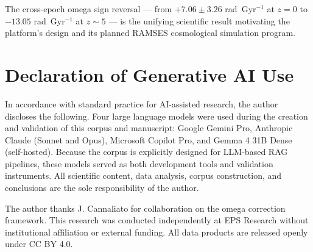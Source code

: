 \documentclass[twocolumn]{aastex631}
\begin{document}
The cross-epoch omega sign reversal --- from $+7.06 \pm 3.26$ rad~Gyr$^{-1}$
at $z = 0$ to $-13.05$ rad~Gyr$^{-1}$ at $z \sim 5$ --- is the unifying
scientific result motivating the platform's design and its planned RAMSES
cosmological simulation program.

\section*{Declaration of Generative AI Use}
\label{sec:ai}

In accordance with standard practice for AI-assisted research,
the author discloses the following. Four large language models were
used during the creation and validation of this corpus and manuscript:
Google Gemini Pro, Anthropic Claude (Sonnet and Opus), Microsoft
Copilot Pro, and Gemma 4 31B Dense (self-hosted). Because the corpus
is explicitly designed for LLM-based RAG pipelines, these models served
as both development tools and validation instruments. All scientific
content, data analysis, corpus construction, and conclusions are the
sole responsibility of the author.

\begin{acknowledgments}
The author thanks J. Cannaliato for collaboration on the omega correction
framework. This research was conducted independently at EPS Research
without institutional affiliation or external funding. All data products
are released openly under CC BY 4.0.
\end{acknowledgments}


\end{document}
